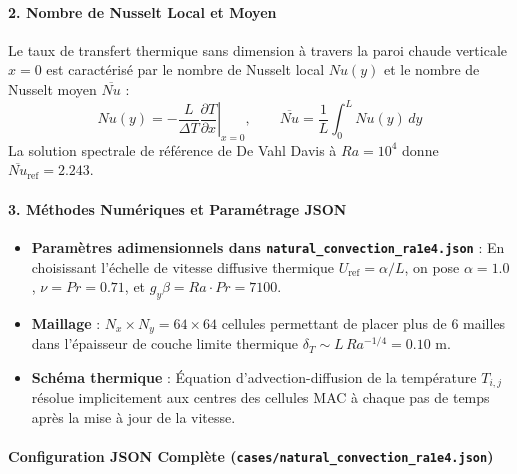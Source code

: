 \documentclass[
  10pt,
]{article}
\providecommand{\tightlist}{%
  \setlength{\itemsep}{0pt}\setlength{\parskip}{0pt}}
\begin{document}
\paragraph{2. Nombre de Nusselt Local et
Moyen}\label{nombre-de-nusselt-local-et-moyen}

Le taux de transfert thermique sans dimension à travers la paroi chaude
verticale \(x = 0\) est caractérisé par le nombre de Nusselt local
\(Nu(y)\) et le nombre de Nusselt moyen \(\overline{Nu}\) :
\[Nu(y) = -\frac{L}{\Delta T} \left.\frac{\partial T}{\partial x}\right|_{x=0}, \qquad \overline{Nu} = \frac{1}{L} \int_0^L Nu(y)\,dy\]
La solution spectrale de référence de De Vahl Davis à \(Ra = 10^4\)
donne \(\overline{Nu}_{\text{ref}} = 2.243\).

\paragraph{3. Méthodes Numériques et Paramétrage
JSON}\label{muxe9thodes-numuxe9riques-et-paramuxe9trage-json-5}

\begin{itemize}
\tightlist
\item
  \textbf{Paramètres adimensionnels dans
  \texttt{natural\_convection\_ra1e4.json}} : En choisissant l'échelle
  de vitesse diffusive thermique \(U_{\text{ref}} = \alpha / L\), on
  pose \(\alpha = 1.0\), \(\nu = Pr = 0.71\), et
  \(g_y \beta = Ra \cdot Pr = 7100\).
\item
  \textbf{Maillage} : \(N_x \times N_y = 64 \times 64\) cellules
  permettant de placer plus de 6 mailles dans l'épaisseur de couche
  limite thermique \(\delta_T \sim L \, Ra^{-1/4} = 0.10\text{ m}\).
\item
  \textbf{Schéma thermique} : Équation d'advection-diffusion de la
  température \(T_{i,j}\) résolue implicitement aux centres des cellules
  MAC à chaque pas de temps après la mise à jour de la vitesse.
\end{itemize}

\paragraph{\texorpdfstring{Configuration JSON Complète
(\texttt{cases/natural\_convection\_ra1e4.json})}{Configuration JSON Complète (cases/natural\_convection\_ra1e4.json)}}\label{configuration-json-compluxe8te-casesnatural_convection_ra1e4.json}
\end{document}
